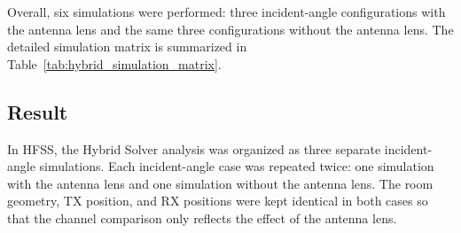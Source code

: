 \documentclass[10pt]{article}
\begin{document}
Overall, six simulations were performed: three incident-angle configurations with the antenna lens
and the same three configurations without the antenna lens. The detailed simulation matrix is
summarized in Table~\ref{tab:hybrid_simulation_matrix}.

\begin{table}[H]
    \centering
    \caption{Hybrid Solver simulation matrix for channel-response evaluation.}
    \label{tab:hybrid_simulation_matrix}
    \footnotesize
    \setlength{\tabcolsep}{5pt}
\end{table}


\subsection{Result}
In HFSS, the Hybrid Solver analysis was organized as three separate incident-angle simulations.
Each incident-angle case was repeated twice: one simulation with the antenna lens and one simulation
without the antenna lens. The room geometry, TX position, and RX positions were kept identical in
both cases so that the channel comparison only reflects the effect of the antenna lens.
\end{document}
